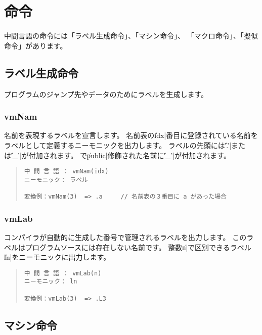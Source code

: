 \section{命令}

中間言語の命令には「ラベル生成命令」、「マシン命令」、
「マクロ命令」、「擬似命令」があります。

\subsection{ラベル生成命令}

プログラムのジャンプ先やデータのためにラベルを生成します。

\subsubsection{vmNam}

名前を表現するラベルを宣言します。
名前表の\|idx|番目に登録されている名前を
ラベルとして定義するニーモニックを出力します。
ラベルの先頭には\|'.'|または\|'_'|が付加されます。
\cmml で\|public|修飾された名前に\|'_'|が付加されます。

\begin{quote}
\begin{verbatim}
中 間 言 語 ： vmNam(idx)
ニーモニック： ラベル

変換例：vmNam(3)  => .a     // 名前表の３番目に a があった場合
\end{verbatim}
\end{quote}

\subsubsection{vmLab}

コンパイラが自動的に生成した番号で管理されるラベルを出力します。
このラベルは\cmm プログラムソースには存在しない名前です。
整数\|n|で区別できるラベル\|ln|をニーモニックに出力します。

\begin{quote}
\begin{verbatim}
中 間 言 語 ： vmLab(n)
ニーモニック： ln

変換例：vmLab(3)  => .L3
\end{verbatim}
\end{quote}

\subsection{マシン命令}

